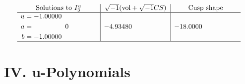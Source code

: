 \documentclass[1p]{elsarticle_modified}
\theoremstyle{definition}
\newcommand{\I}{\sqrt{-1}}
\begin{document}
$$\begin{array}{c|c|c}  
\text{Solutions to }I^u_{3}& \I (\text{vol} + \sqrt{-1}CS) & \text{Cusp shape}\\
 \hline 
\begin{aligned}
u &= -1.00000\phantom{ +0.000000I} \\
a &= \phantom{-0.000000 } 0 \\
b &= -1.00000\phantom{ +0.000000I}\end{aligned}
 & -4.93480\phantom{ +0.000000I} & -18.0000\phantom{ +0.000000I}\\
 \hline 
 \end{array}$$\newpage
\newpage\renewcommand{\arraystretch}{1}
\centering \section*{ IV. u-Polynomials}
\end{document}
